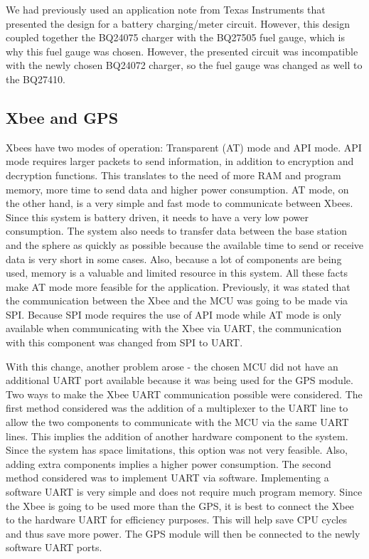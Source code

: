 We had previously used an application note \cite{batMeterAppNote} from Texas Instruments that presented the design for a battery charging/meter circuit.  However, this design coupled together the BQ24075 charger with the BQ27505 fuel gauge, which is why this fuel gauge was chosen.  However, the presented circuit was incompatible with the newly chosen BQ24072 charger, so the fuel gauge was changed as well to the BQ27410.


\subsection{Xbee and GPS}

Xbees have two modes of operation: Transparent (AT) mode and API mode. API mode requires larger packets to send information, in addition to encryption and decryption functions.  This translates to the need of more RAM and program memory, more time to send data and higher power consumption.  AT mode, on the other hand, is a very simple and fast mode to communicate between Xbees. Since this system is battery driven, it needs to have a very low power consumption.  The system also needs to transfer data between the base station and the sphere as quickly as possible because the available time to send or receive data is very short in some cases.  Also, because a lot of components are being used, memory is a valuable and limited resource in this system. All these facts make AT mode more feasible for the application. Previously, it was stated that the communication between the Xbee and the MCU was going to be made via SPI. Because SPI mode requires the use of API mode while AT mode is only available when communicating with the Xbee via UART, the communication with this component was changed from SPI to UART.

With this change, another problem arose - the chosen MCU did not have an additional UART port available because it was being used for the GPS module. Two ways to make the Xbee UART communication possible were considered.  The first method considered was the addition of a multiplexer to the UART line to allow the two components to communicate with the MCU via the same UART lines.  This implies the addition of another hardware component to the system.  Since the system has space limitations, this option was not very feasible.  Also, adding extra components implies a higher power consumption.  The second method considered was to implement UART via software.  Implementing a software UART is very simple and does not require much program memory. Since the Xbee is going to be used more than the GPS, it is best to connect the Xbee to the hardware UART for efficiency purposes.  This will help save CPU cycles and thus save more power.  The GPS module will then be connected to the newly software UART ports.

